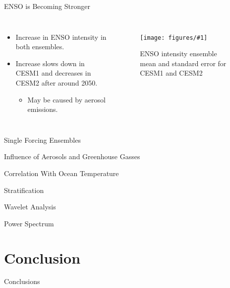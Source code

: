 \documentclass{beamer}
\newcommand{\myfig}[3]{
  \begin{figure}
    \centering
    \texttt{[image: figures/\#1]}
    \caption{#2}
    \label{fig:#3}
  \end{figure}
}
\begin{document}
\begin{frame}{ENSO is Becoming Stronger}
  \begin{columns}
    \begin{itemize}
    \item Increase in ENSO intensity in both ensembles.
    \item Increase slows down in CESM1 and decreases in CESM2 after around 2050.
      \begin{itemize}
      \item May be caused by aerosol emissions.
      \end{itemize}
    \end{itemize}
    \myfig{ff_compare.pdf}{ENSO intensity ensemble mean and standard error for CESM1 and CESM2}{ff_compare}
  \end{columns}
\end{frame}

\begin{frame}{Single Forcing Ensembles}

\end{frame}

\begin{frame}{Influence of Aerosols and Greenhouse Gasses}

\end{frame}

\begin{frame}{Correlation With Ocean Temperature}

\end{frame}

\begin{frame}{Stratification}

\end{frame}

\begin{frame}{Wavelet Analysis}

\end{frame}

\begin{frame}{Power Spectrum}

\end{frame}

\section{Conclusion}

\begin{frame}{Conclusions}

\end{frame}
\end{document}
